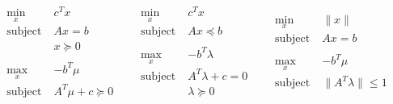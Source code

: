 \documentclass[a4paper, 10pt]{article}
\newcommand{\norm}[1]{\|#1\|}
\begin{document}
\begin{equation*}
\begin{array}{l|l|l}
    \begin{array}{lll}
      \underset{x}{\text{min}} & c^T x \\
      \text{subject to} & A x = b \\
                               &  x \succeq 0 \\
      & & \\
      \underset{x}{\text{max}} & - b^T \mu \\
      \text{subject to} & A^T \mu + c \succeq 0\\
    \end{array} &
    \begin{array}{lll}
      \underset{x}{\text{min}} & c^T x \\
      \text{subject to} & A x \preceq b \\
      & & \\
      \underset{x}{\text{max}} & - b^T \lambda \\
      \text{subject to} & A^T \lambda + c = 0\\
                               & \lambda \succeq 0\\
    \end{array} &
    \begin{array}{lll}
      \underset{x}{\text{min}} & \norm{x} \\
      \text{subject to} & A x = b \\
      & & \\
      \underset{x}{\text{max}} & - b^T \mu \\
      \text{subject to} & \norm{A^T \lambda} \le 1\\
    \end{array}
\end{array}
\end{equation*}
\end{document}

